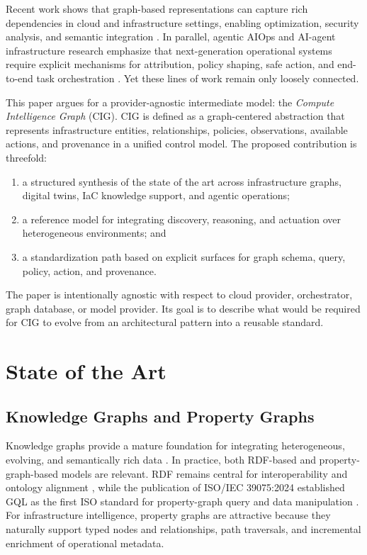 \documentclass[conference]{IEEEtran}
\begin{document}
Recent work shows that graph-based representations can capture rich dependencies in cloud and infrastructure settings, enabling optimization, security analysis, and semantic integration \cite{khan2024cost,li2024infrastructuredt,schoberl2024certgraph,cartography2026}. In parallel, agentic AIOps and AI-agent infrastructure research emphasize that next-generation operational systems require explicit mechanisms for attribution, policy shaping, safe action, and end-to-end task orchestration \cite{zota2025agentic,chen2025aiopslab,hadfield2025infraagents}. Yet these lines of work remain only loosely connected.

This paper argues for a provider-agnostic intermediate model: the \emph{Compute Intelligence Graph} (CIG). CIG is defined as a graph-centered abstraction that represents infrastructure entities, relationships, policies, observations, available actions, and provenance in a unified control model. The proposed contribution is threefold:
\begin{enumerate}
    \item a structured synthesis of the state of the art across infrastructure graphs, digital twins, IaC knowledge support, and agentic operations;
    \item a reference model for integrating discovery, reasoning, and actuation over heterogeneous environments; and
    \item a standardization path based on explicit surfaces for graph schema, query, policy, action, and provenance.
\end{enumerate}

The paper is intentionally agnostic with respect to cloud provider, orchestrator, graph database, or model provider. Its goal is to describe what would be required for CIG to evolve from an architectural pattern into a reusable standard.

\section{State of the Art}
\subsection{Knowledge Graphs and Property Graphs}
Knowledge graphs provide a mature foundation for integrating heterogeneous, evolving, and semantically rich data \cite{hogan2021kg}. In practice, both RDF-based and property-graph-based models are relevant. RDF remains central for interoperability and ontology alignment \cite{w3c2014rdf}, while the publication of ISO/IEC 39075:2024 established GQL as the first ISO standard for property-graph query and data manipulation \cite{iso2024gql}. For infrastructure intelligence, property graphs are attractive because they naturally support typed nodes and relationships, path traversals, and incremental enrichment of operational metadata.
\end{document}
